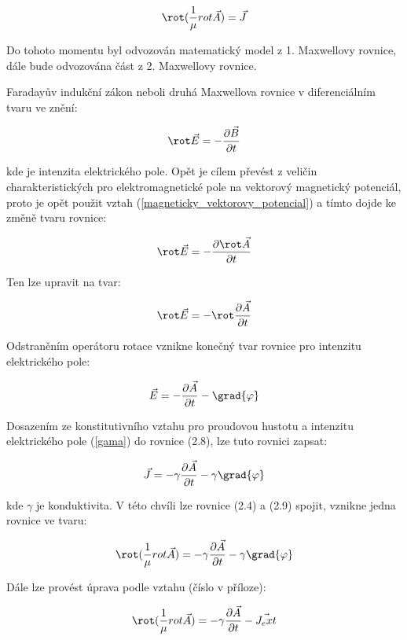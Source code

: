 \begin{equation}
 \rot (\frac{1}{\mu} {rot \vec{A}}) = \vec{J}
\end{equation}

Do tohoto momentu byl odvozován matematický model z 1. Maxwellovy rovnice, dále bude odvozována část z 2. Maxwellovy rovnice.
	
	Faradayův indukční zákon neboli druhá Maxwellova rovnice v diferenciálním tvaru ve znění:

\begin{equation}
	\rot \vec{E} = - \frac{\partial \vec{B}}{\partial t}
\end{equation}

kde  je intenzita elektrického pole. Opět je cílem převést z veličin charakteristických pro elektromagnetické pole na vektorový magnetický potenciál, proto je opět použit vztah (\ref{magneticky_vektorovy_potencial}) a tímto dojde ke změně tvaru rovnice:

\begin{equation}
	\rot \vec{E} = - \frac{\partial\rot\vec{A}}{\partial t}
\end{equation}

Ten lze upravit na tvar:

\begin{equation}
	\rot \vec{E} = - \rot \frac{\partial\vec{A}}{\partial t}
\end{equation}

Odstraněním operátoru rotace vznikne konečný tvar rovnice pro intenzitu elektrického pole:

\begin{equation}
	\vec{E} = - \frac{\partial \vec{A}}{\partial t} - \grad{\varphi}
\end{equation}

Dosazením ze konstitutivního vztahu pro proudovou hustotu  a intenzitu elektrického pole  (\ref{gama}) do rovnice (2.8), lze tuto rovnici zapsat:

\begin{equation}
	\vec{J} = - \gamma \frac{\partial \vec{A}}{\partial t} - \gamma \grad{\varphi}
\end{equation}

kde $\gamma$ je konduktivita. V této chvíli lze rovnice (2.4) a (2.9) spojit, vznikne jedna rovnice ve tvaru:

\begin{equation}
	\rot (\frac{1}{\mu} {rot \vec{A}}) = - \gamma \frac{\partial \vec{A}}{\partial t} - \gamma \grad{\varphi}
\end{equation}

Dále lze provést úprava podle vztahu (číslo v příloze):

\begin{equation}
	\rot (\frac{1}{\mu} {rot \vec{A}}) = - \gamma \frac{\partial \vec{A}}{\partial t} - \vec{J_ext}
\end{equation}




